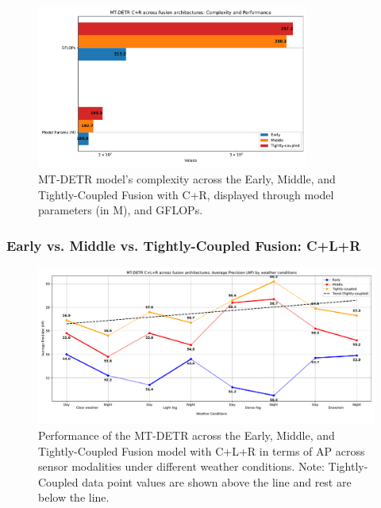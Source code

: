 \documentclass[report.tex]{subfiles}
\begin{document}
    \begin{figure}[h!]
        \centering
        \includegraphics[width=0.8\textwidth]{images/results/mtdetr/EMT_CR/model_complexity.pdf}
        \caption{MT-DETR model's complexity across the Early, Middle, and Tightly-Coupled Fusion with C+R, displayed through model parameters (in M), and GFLOPs.}
        \label{fig:mtdetr_emt_cr_model_complexity}
    \end{figure}

    \FloatBarrier
    \subsubsection{Early vs. Middle vs. Tightly-Coupled Fusion: C+L+R}

    \begin{figure}[h!]
        \centering
        \includegraphics[width=1.0\textwidth]{images/results/mtdetr/EMT_CLR/ap.pdf}
        \caption{Performance of the MT-DETR across the Early, Middle, and Tightly-Coupled Fusion model with C+L+R in terms of AP across sensor modalities under different weather conditions. Note: Tightly-Coupled data point values are shown above the line and rest are below the line.}
        \label{fig:mtdetr_emt_crl_ap}
    \end{figure}
\end{document}
